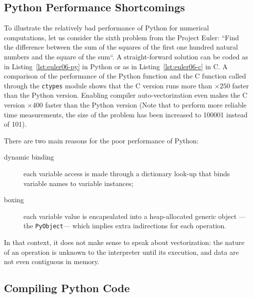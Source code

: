 \documentclass[10pt]{sigplanconf}
\begin{document}
\subsection{Python Performance Shortcomings}

To illustrate the relatively bad performance of Python for numerical
computations, let us consider the sixth problem from the Project Euler: ``Find
the difference between the sum of the squares of the first one hundred natural
numbers and the square of the sum``. A straight-forward solution can be coded
as in Listing~\ref{lst:euler06-py} in Python or as in
Listing~\ref{lst:euler06-c} in C. A comparison of the performance of the Python
function and the C function called through the \texttt{ctypes} module shows
that the C version runs more than $\times250$ faster than the Python version.
Enabling compiler auto-vectorization even makes the C version $\times400$
faster than the Python version (Note that to perform more reliable time
measurements, the size of the problem has been increased to 100001 instead of
101).

There are two main reasons for the poor performance of Python:

\begin{description}

    \item[dynamic binding] each variable access is made through a dictionary
        look-up that binds variable names to variable instances;

    \item[boxing] each variable value is encapsulated into a heap-allocated
        generic object ---the \texttt{PyObject}--- which implies extra
        indirections for each operation.

\end{description}

In that context, it does not make sense to speak about vectorization: the
nature of an operation is unknown to the interpreter until its execution, and
data are not even contiguous in memory.






\subsection{Compiling Python Code}
\end{document}
